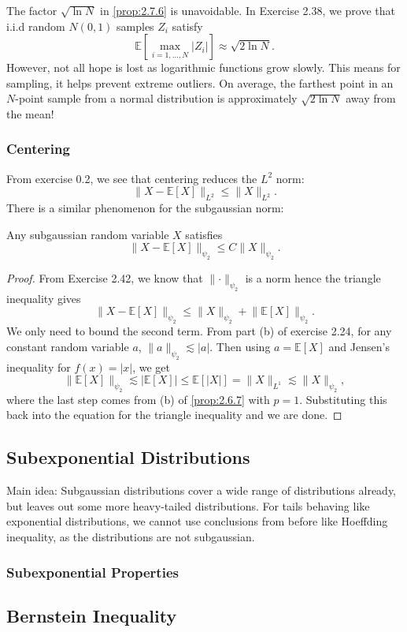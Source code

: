 \begin{remark}
\label{rmk:2.7.7}
The factor $\sqrt{\ln{N}}$ in \cref{prop:2.7.6} is unavoidable. In Exercise 2.38, we prove that 
i.i.d random $N(0, 1)$ samples $Z_i$ satisfy 
\[ \mathbb{E}[\max_{i = 1, \dots, N} |Z_i|] \approx \sqrt{2 \ln{N}}. \]
However, not all hope is lost as logarithmic functions grow slowly. This means for sampling, 
it helps prevent extreme outliers. On average, the farthest point in an $N$-point sample from a 
normal distribution is approximately $\sqrt{2 \ln{N}}$ away from the mean!
\end{remark}


\subsubsection{Centering}
From exercise 0.2, we see that centering reduces the $L^2$ norm: 
\[ \lVert X - \mathbb{E}[X] \rVert_{L^2} \leq \lVert X \rVert_{L^2}. \]
There is a similar phenomenon for the subgaussian norm: 
\begin{lemma}[Centering]
\label{lem:2.7.8}
Any subgaussian random variable $X$ satisfies 
\[ \lVert X - \mathbb{E}[X] \rVert_{\psi_2} \leq C \lVert X \rVert_{\psi_2}. \]
\end{lemma}

\begin{proof}
From Exercise 2.42, we know that $\lVert \cdot \rVert_{\psi_2}$ is a norm hence the triangle inequality gives 
\[ \lVert X - \mathbb{E}[X] \rVert_{\psi_2} \leq \lVert X \rVert_{\psi_2} 
+ \lVert \mathbb{E}[X] \rVert_{\psi_2}. \]
We only need to bound the second term. From part (b) of exercise 2.24, for any constant random 
variable $a$, $\lVert a \rVert_{\psi_2} \lesssim |a|$. Then using $a = \mathbb{E}[X]$ and Jensen's inequality 
for $f(x) = |x|$, we get
\[ \lVert \mathbb{E}[X] \rVert_{\psi_2} \lesssim |\mathbb{E}[X]| \leq \mathbb{E}[|X|] 
= \lVert X \rVert_{L^1} \lesssim \lVert X \rVert_{\psi_2}, \]
where the last step comes from (b) of \cref{prop:2.6.7} with $p = 1$. Substituting this back into the 
equation for the triangle inequality and we are done.
\end{proof}


\subsection{Subexponential Distributions}
Main idea: Subgaussian distributions cover a wide range of distributions already, but leaves out 
some more heavy-tailed distributions. For tails behaving like exponential distributions, we cannot use 
conclusions from before like Hoeffding inequality, as the distributions are not subgaussian. 


\subsubsection{Subexponential Properties}



\subsection{Bernstein Inequality}

